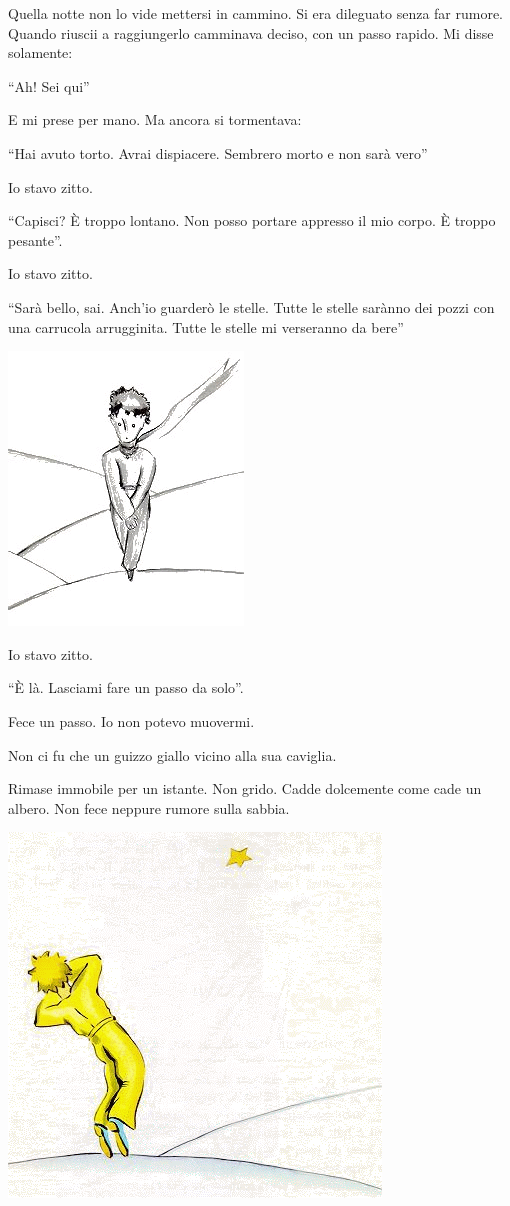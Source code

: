 \documentclass[11pt]{scrbook}
\begin{document}
Quella notte non lo vide mettersi in cammino. Si era dileguato senza far rumore. Quando riuscii a raggiungerlo camminava deciso, con un passo rapido. Mi disse solamente:

``Ah! Sei qui''

E mi prese per mano. Ma ancora si tormentava:

``Hai avuto torto. Avrai dispiacere. Sembrero morto e non sarà vero''

Io stavo zitto.

``Capisci? È troppo lontano. Non posso portare appresso il mio corpo. È troppo pesante''.

Io stavo zitto.

``Sarà bello, sai. Anch'io guarderò le stelle. Tutte le stelle sarànno dei pozzi con una carrucola arrugginita. Tutte le stelle mi verseranno da bere''

\begin{center}
\includegraphics{img/26c}
\end{center}

Io stavo zitto.

``È là. Lasciami fare un passo da solo''.

Fece un passo. Io non potevo muovermi.

Non ci fu che un guizzo giallo vicino alla sua caviglia.

Rimase immobile per un istante. Non grido. Cadde dolcemente come cade un
albero. Non fece neppure rumore sulla sabbia.

\begin{center}
\includegraphics{img/zlaty}
\end{center}
\end{document}
